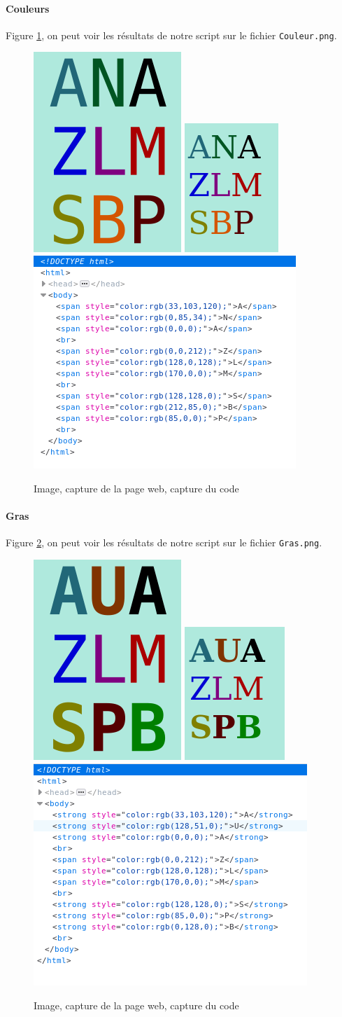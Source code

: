 \documentclass[a4paper,12pt,titlepage]{report}
\begin{document}
	\paragraph{Couleurs}
	Figure \ref{coul}, on peut voir les résultats de notre script sur le fichier \texttt{Couleur.png}.
	\begin{figure}[h]
	\centering
		\includegraphics[height=0.2\textwidth]{../illus/Couleur.png}
		\includegraphics[height=0.2\textwidth]{../illus/CouleurR.png}
		\includegraphics[height=0.2\textwidth]{../illus/CouleurC.png}
		\caption{Image, capture de la page web, capture du code}
		\label{coul}
	\end{figure}
	\paragraph{Gras}
Figure \ref{gras}, on peut voir les résultats de notre script sur le fichier \texttt{Gras.png}.
	\begin{figure}[h]
	\centering
		\includegraphics[height=0.2\textwidth]{../illus/Gras.png}
		\includegraphics[height=0.2\textwidth]{../illus/GrasR.png}
		\includegraphics[height=0.2\textwidth]{../illus/GrasC.png}
		\caption{Image, capture de la page web, capture du code}
		\label{gras}
	\end{figure}
\end{document}

